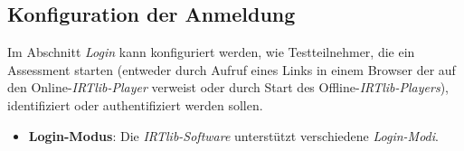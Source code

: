 \documentclass[
  letterpaper,
  DIV=11]{scrreprt}
\begin{document}
\begin{tcolorbox}[enhanced jigsaw, colbacktitle=quarto-callout-tip-color!10!white, coltitle=black, colframe=quarto-callout-tip-color-frame, leftrule=.75mm, breakable, opacitybacktitle=0.6, toprule=.15mm, title=\textcolor{quarto-callout-tip-color}{\faLightbulb}\hspace{0.5em}{Eingebettete Programmhilfe}, colback=white, titlerule=0mm, arc=.35mm, bottomtitle=1mm, toptitle=1mm, rightrule=.15mm, bottomrule=.15mm, left=2mm, opacityback=0]

\hypertarget{konfiguration-der-anmeldung-1}{%
\subsection{Konfiguration der
Anmeldung}\label{konfiguration-der-anmeldung-1}}

Im Abschnitt \emph{Login} kann konfiguriert werden, wie Testteilnehmer,
die ein Assessment starten (entweder durch Aufruf eines Links in einem
Browser der auf den Online-\emph{IRTlib-Player} verweist oder durch
Start des Offline-\emph{IRTlib-Players}), identifiziert oder
authentifiziert werden sollen.

\begin{itemize}
\item
  \textbf{Login-Modus}: Die \emph{IRTlib-Software} unterstützt
  verschiedene \emph{Login-Modi}.


\end{itemize}
\end{tcolorbox}
\end{document}
